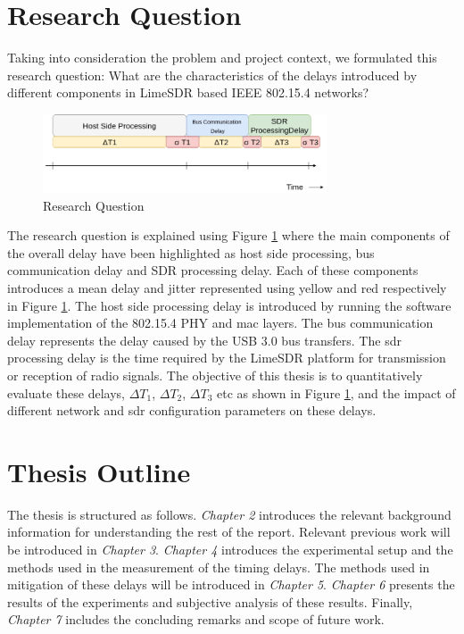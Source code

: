 







\section{Research Question}
Taking into consideration the problem and project context, we formulated this research question:
What are the characteristics of the delays introduced by different components in LimeSDR based IEEE 802.15.4 networks?\\
\begin{figure}[!h]
\centering
\includegraphics[width=0.75\textwidth]{Figure/RQ1.png}
\caption{Research Question}
\label{rq1}
\end{figure}

The research question is explained using Figure \ref{rq1} where the main components of the overall delay have been highlighted as host side processing, bus communication delay and SDR processing delay. 
Each of these components introduces a mean delay and jitter represented using yellow and red respectively in Figure \ref{rq1}.
The host side processing delay is introduced by running the software implementation of the 802.15.4 \ac{PHY} and \ac{mac} layers.
The bus communication delay represents the delay caused by the \ac{USB} 3.0 bus transfers.
The \ac{sdr} processing delay is the time required by the LimeSDR platform for transmission or reception of radio signals.
The objective of this thesis is to quantitatively evaluate these delays, $\Delta T_1$, $\Delta T_2$, $\Delta T_3$ etc as shown in Figure \ref{rq1}, and the impact of different network and \ac{sdr} configuration parameters on these delays.

\section{Thesis Outline}
The thesis is structured as follows. \textit{Chapter 2} introduces the relevant background information for understanding the rest of the report.
Relevant previous work will be introduced in \textit{Chapter 3}.
\textit{Chapter 4} introduces the experimental setup and the methods used in the measurement of the timing delays.
The methods used in mitigation of these delays will be introduced in \textit{Chapter 5}.
\textit{Chapter 6} presents the results of the experiments and subjective analysis of these results.
Finally, \textit{Chapter 7} includes the concluding remarks and scope of future work.
